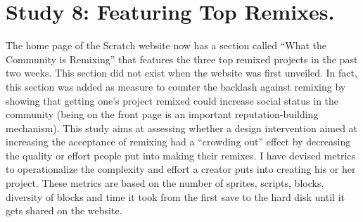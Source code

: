 \section{Study 8: Featuring Top Remixes.}
The home page of the Scratch website now has a section called ``What the Community is Remixing''  that features the three top remixed projects in the past two weeks.
This section did not exist when the website was first unveiled.
In fact, this section was added as measure to counter the backlash against remixing by showing that getting one's project remixed could increase social status in the community (being on the front page is an important reputation-building mechanism).
This study aims at assessing whether a design intervention aimed at increasing the acceptance of remixing had a ``crowding out'' effect by decreasing the quality or effort people put into making their remixes.
I have devised metrics to operationalize the complexity and effort a creator puts into creating his or her project. These metrics are based on the number of sprites, scripts, blocks, diversity of blocks and time it took from the first save to the hard disk until it gets shared on the website.

